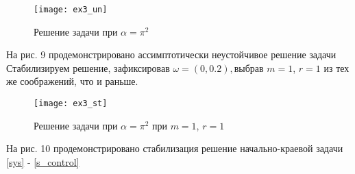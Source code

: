 \begin{figure}[H]
  \centering
  \texttt{[image: ex3\_un]}
  \caption{Решение задачи при $\alpha = \pi^2$}
\end{figure}

На рис. 9 продемонстрировано ассимптотически неустойчивое решение задачи\\

Стабилизируем решение, зафиксировав $\omega = (0, 0.2), $выбрав $m = 1$, $r = 1$ из тех же соображений, что и раньше.

\begin{figure}[H]
  \centering
  \texttt{[image: ex3\_st]}
  \caption{Решение задачи при $\alpha = \pi^2$ при $m = 1$, $r = 1$}
\end{figure}  

На рис. 10 продемонстрировано стабилизация решение начально-краевой задачи \eqref{sys} - \eqref{s_control}